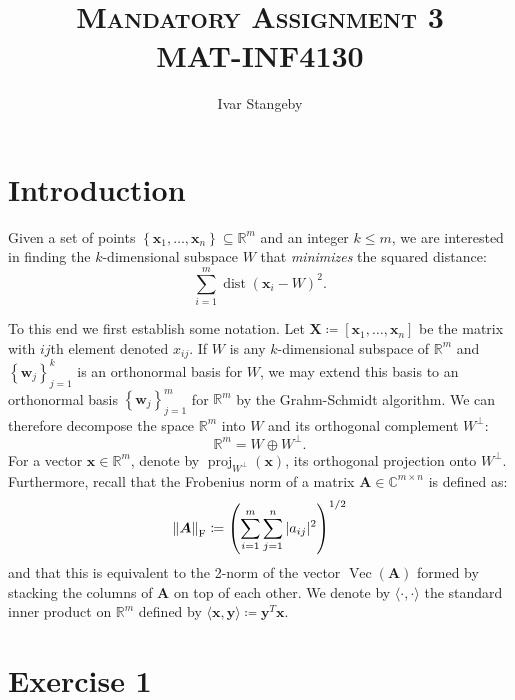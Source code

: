 \documentclass[article, a4paper, oneside, 12pt]{memoir}
\title{\textsc{Mandatory Assignment 3 \\ 
MAT-INF4130}}
\author{Ivar Stangeby}
\DeclareMathOperator{\dist}{dist}
\DeclareMathOperator{\proj}{proj}
\DeclareMathOperator{\vect}{Vec}
\newcommand{\mat}[1]{\bm{#1}}
\newcommand{\frob}[1]{\norm{#1}_{\mathrm{F}}}
\begin{document}
\maketitle 

\chapter{Introduction}        

Given a set of points \( \left\{\mat{x}_1, \ldots, \mat{x}_n\right\} \subseteq
\mathbb{R}^m \) and an integer \( k \leq m \), we are interested in finding the
\( k \)-dimensional subspace \( W \) that \emph{minimizes} the squared
distance:
\begin{equation}
    \sum_{i = 1}^m \dist(\mat{x}_i - W)^2.
\end{equation}

To this end we first establish some notation. Let \( \mat{X} \coloneqq
[\mat{x}_1, \ldots, \mat{x}_n]\) be the matrix with \(ij\)th element denoted
\(x_{ij} \).  If \( W \) is any \(k\)-dimensional subspace of \( \mathbb{R}^m
\) and \( \left\{ \mat{w}_j \right\}_{j=1}^k\) is an orthonormal basis for \( W
\), we may extend this basis to an orthonormal basis \( \left\{ \mat{w}_j
\right\}_{j=1}^m \) for \( \mathbb{R}^m \) by the Grahm-Schmidt algorithm. We
can therefore decompose the space \( \mathbb{R}^m \) into \( W \) and its
orthogonal complement \( W^\perp \):
\begin{equation}
    \mathbb{R}^m = W \oplus W^\perp.
\end{equation}
For a vector \( \mat{x} \in \mathbb{R}^m\), denote by \(
\proj_{W^\perp}(\mat{x}) \), its orthogonal projection onto \( W^\perp \).
Furthermore, recall that the Frobenius norm of a matrix \( \mat{A} \in
\mathbb{C}^{m\times n}\) is defined as:
\begin{equation}
    \frob{\mat{A}} \coloneqq \left( \sum_{i=1}^m \sum_{j=1}^n |a_{ij}|^2 \right)^{1/2}
\end{equation}
and that this is equivalent to the 2-norm of the vector \( \vect(\mat{A}) \)
formed by stacking the columns of \( \mat{A} \) on top of each other.  We
denote by \( \langle \cdot, \cdot \rangle \) the standard inner product on
\( \mathbb{R}^m \) defined by
\( \langle \mat{x}, \mat{y} \rangle \coloneqq \mat{y}^T \mat{x} \).

\chapter*{Exercise 1}
\end{document}
